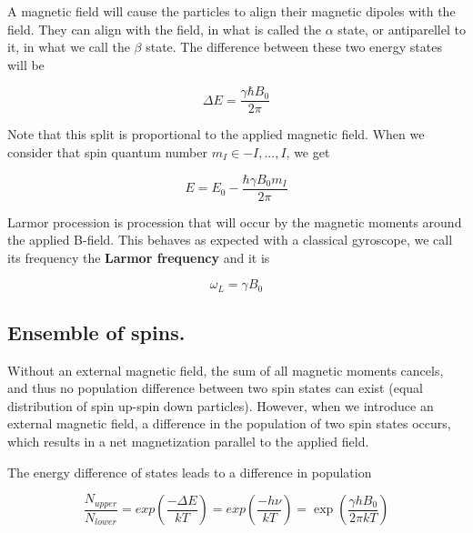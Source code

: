\documentclass[12pt]{article}
\begin{document}
A magnetic field will cause the particles to align their magnetic dipoles with the field. They can align with the field, in what is called the $\alpha$ state, or antiparellel to it, in what we call the $\beta$ state. The difference between these two energy states will be

\[\Delta E = \frac{\gamma \hbar B_0}{2\pi} \]

Note that this split is proportional to the applied magnetic field. When we consider that spin quantum number $m_I \in {-I, ..., I}$, we get

\[E = E_0 - \frac{\hbar \gamma B_0 m_I}{2\pi}\]






Larmor procession is procession that will occur by the magnetic moments around the applied B-field. This behaves as expected with a classical gyroscope, we call its frequency the \textbf{Larmor frequency} and it is

\[ \omega_L = \gamma B_0\]


\subsection{ Ensemble of spins.
}

Without an external magnetic field, the sum of all magnetic moments cancels, and thus no population difference between two spin states can exist (equal distribution of spin up-spin down particles). However, when we introduce an external magnetic field, a difference in the population of two spin states occurs, which results in a net magnetization parallel to the applied field.

The energy difference of states leads to a difference in population

\[\frac{N_{upper}}{N_{lower}} = exp({\frac{-\Delta E}{kT}}) = exp({\frac{-h \nu}{kT}}) = \exp({\frac{\gamma h B_0}{2\pi kT}})\]

\end{document}
